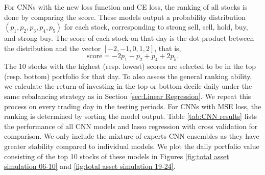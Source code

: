 \documentclass[preprint,12pt,numafflabel,authoryear]{elsarticle}
\begin{document}
For CNNs with the new loss function and CE loss, the ranking of all stocks is done by comparing the score. These models output a probability distribution $(p_1, p_2, p_3, p_4, p_5)$ for each stock, corresponding to strong sell, sell, hold, buy, and strong buy. The score of each stock on that day is the dot product between the distribution and the vector $[-2, -1, 0, 1, 2]$, that is,
\begin{equation}
\label{eq:score}
\mathrm{score} = -2p_1 - p_2 + p_4 + 2p_5.
\end{equation}
The 10 stocks with the highest (resp. lowest) scores are selected to be in the top (resp. bottom) portfolio for that day. To also assess the general ranking ability, we calculate the return of investing in the top or bottom decile daily under the same rebalancing strategy as in Section \ref{sec:Linear Regression}. We repeat this process on every trading day in the testing periods. For CNNs with MSE loss, the ranking is determined by sorting the model output. Table \ref{tab:CNN results} lists the performance of all CNN models and lasso regression with cross validation for comparison. We only include the mixture-of-experts CNN ensembles as they have greater stability compared to individual models. We plot the daily portfolio value consisting of the top 10 stocks of these models in Figures \ref{fig:total asset simulation 06-10} and \ref{fig:total asset simulation 19-24}.
\end{document}
